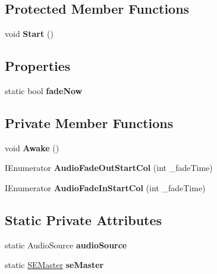 \subsection*{Protected Member Functions}
\begin{DoxyCompactItemize}
\item 
\mbox{\label{class_s_e_master_a5323739dab51ffb7b17066e03c8d3f8b}} 
void {\bfseries Start} ()
\end{DoxyCompactItemize}
\subsection*{Properties}
\begin{DoxyCompactItemize}
\item 
\mbox{\label{class_s_e_master_a3a9b1605e5a2e37fbadc105132255551}} 
static bool {\bfseries fade\+Now}
\end{DoxyCompactItemize}
\subsection*{Private Member Functions}
\begin{DoxyCompactItemize}
\item 
\mbox{\label{class_s_e_master_a3f138d3bb0b7b5056a0c48410b0a36e0}} 
void {\bfseries Awake} ()
\item 
\mbox{\label{class_s_e_master_a80a266977b602ff0fff57fe8f4cce362}} 
I\+Enumerator {\bfseries Audio\+Fade\+Out\+Start\+Col} (int \+\_\+fade\+Time)
\item 
\mbox{\label{class_s_e_master_a57505bf4b38ecfa23bb0b9bd433241fd}} 
I\+Enumerator {\bfseries Audio\+Fade\+In\+Start\+Col} (int \+\_\+fade\+Time)
\end{DoxyCompactItemize}
\subsection*{Static Private Attributes}
\begin{DoxyCompactItemize}
\item 
\mbox{\label{class_s_e_master_abd5ca90b855ac79635f2307604899609}} 
static Audio\+Source {\bfseries audio\+Source}
\item 
\mbox{\label{class_s_e_master_a4307c5e68d47429cc54e89e36119b4b8}} 
static \hyperlink{class_s_e_master}{S\+E\+Master} {\bfseries se\+Master}
\end{DoxyCompactItemize}



